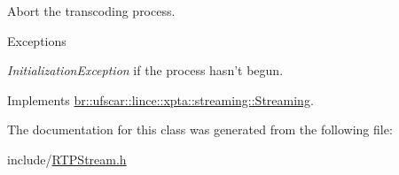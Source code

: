 Abort the transcoding process. 


\begin{DoxyExceptions}{Exceptions}
\item[{\em InitializationException}]if the process hasn't begun. \end{DoxyExceptions}


Implements \hyperlink{classbr_1_1ufscar_1_1lince_1_1xpta_1_1streaming_1_1Streaming_a2d1975eb985a2854d4d6f4c36c002910}{br::ufscar::lince::xpta::streaming::Streaming}.



The documentation for this class was generated from the following file:\begin{DoxyCompactItemize}
\item 
include/\hyperlink{RTPStream_8h}{RTPStream.h}\end{DoxyCompactItemize}
